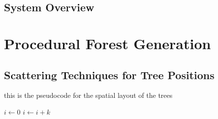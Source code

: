 \documentclass{article}
\newcommand{\desc}[1]{\textcolor{lightblue}{\textbf{\newline description: }\it{#1} \newline}}
\begin{document}
\subsection{System Overview}




\section{Procedural Forest Generation}


\subsection{Scattering Techniques for Tree Positions}


\begin{algorithm}

\caption{this is the pseudocode for the spatial layout of the trees}
\begin{algorithmic}
        \STATE $i\gets 0$
\ELSE
                \STATE $i\gets i+k$
        \ENDIF
\ENDIF 
\end{algorithmic}

\end{algorithm}
\end{document}
